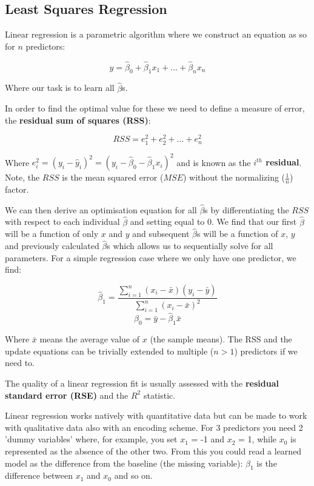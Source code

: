 \subsection{Least Squares Regression}

Linear regression is a parametric algorithm where we construct an equation as so for $n$ predictors:

$$ \hat{y} = \hat{\beta}_{0} + \hat{\beta}_{1}x_{1} + ... + \hat{\beta}_{n}x_{n} $$

Where our task is to learn all $\hat{\beta}$s.

In order to find the optimal value for these we need to define a measure of error, the \textbf{residual sum of squares (RSS)}:

$$ RSS = e_{1}^{2} + e_{2}^{2} + ... + e_{n}^{2} $$

Where $e_{i}^{2} = (y_{i} - \hat{y}_{i})^{2} = (y_{i} - \hat{\beta}_{0} - \hat{\beta}_{1}x_{i})^{2}$ and is known as the \textbf{$i^{th}$ residual}. Note, the $RSS$ is the mean squared error ($MSE$) without the normalizing ($\frac{1}{n}$) factor.

We can then derive an optimisation equation for all $\hat{\beta}$s by differentiating the $RSS$ with respect to each individual $\hat{\beta}$ and setting equal to 0. We find that our first $\hat{\beta}$ will be a function of only $x$ and $y$ and subsequent $\hat{\beta}$s will be a function of $x$, $y$ and previously calculated $\hat{\beta}$s which allows us to sequentially solve for all parameters. For a simple regression case where we only have one predictor, we find:

$$ \hat{\beta}_{1} = \frac{\sum_{i=1}^{n} (x_{i} - \bar{x})(y_{i} - \bar{y})}{\sum_{i=1}^{n} (x_{i} - \bar{x})^{2}} $$
$$ \hat{\beta}_{0} = \bar{y} - \hat{\beta}_{1}\bar{x} $$

Where $\bar{x}$ means the average value of $x$ (the sample means). The RSS and the update equations can be trivially extended to multiple ($n>1$) predictors if we need to.

The quality of a linear regression fit is usually assessed with the \textbf{residual standard error (RSE)} and the $R^{2}$ statistic.

Linear regression works natively with quantitative data but can be made to work with qualitative data also with an encoding scheme. For 3 predictors you need 2 'dummy variables' where, for example, you set $x_{1}$ = -1 and $x_{2}$ = 1, while $x_{0}$ is represented as the absence of the other two. From this you could read a learned model as the difference from the baseline (the missing variable): $\beta_{1}$ is the difference between $x_{1}$ and $x_{0}$ and so on.

